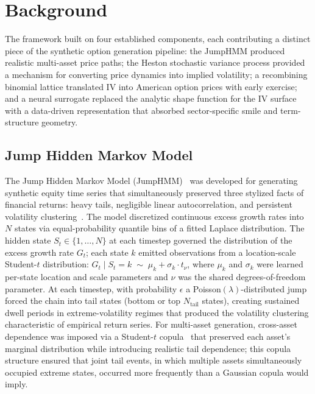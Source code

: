 \section{Background}\label{sec:background}

The framework built on four established components, each contributing a distinct piece of the synthetic option generation pipeline: the JumpHMM produced realistic multi-asset price paths; the Heston stochastic variance process provided a mechanism for converting price dynamics into implied volatility; a recombining binomial lattice translated IV into American option prices with early exercise; and a neural surrogate replaced the analytic shape function for the IV surface with a data-driven representation that absorbed sector-specific smile and term-structure geometry.

\subsection{Jump Hidden Markov Model}

The Jump Hidden Markov Model (JumpHMM)~\cite{jumphmm2025} was developed for generating synthetic equity time series that simultaneously preserved three stylized facts of financial returns: heavy tails, negligible linear autocorrelation, and persistent volatility clustering~\cite{cont2001}. The model discretized continuous excess growth rates into $N$ states via equal-probability quantile bins of a fitted Laplace distribution. The hidden state $S_t \in \{1, \ldots, N\}$ at each timestep governed the distribution of the excess growth rate $G_t$; each state $k$ emitted observations from a location-scale Student-$t$ distribution: $G_t \mid S_t\!=\!k \;\sim\; \mu_k + \sigma_k \cdot t_\nu$, where $\mu_k$ and $\sigma_k$ were learned per-state location and scale parameters and $\nu$ was the shared degrees-of-freedom parameter. At each timestep, with probability $\epsilon$ a Poisson$(\lambda)$-distributed jump forced the chain into tail states (bottom or top $N_{\text{tail}}$ states), creating sustained dwell periods in extreme-volatility regimes that produced the volatility clustering characteristic of empirical return series. For multi-asset generation, cross-asset dependence was imposed via a Student-$t$ copula~\cite{demarta2005} that preserved each asset's marginal distribution while introducing realistic tail dependence; this copula structure ensured that joint tail events, in which multiple assets simultaneously occupied extreme states, occurred more frequently than a Gaussian copula would imply.

